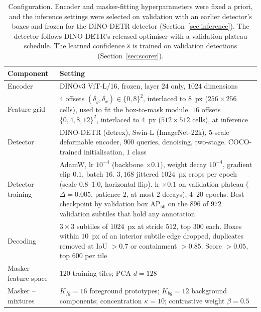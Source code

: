 \documentclass[remotesensing,article,submit,moreauthors]{Definitions/mdpi}
\begin{document}
\begin{table}[H]
\footnotesize
\renewcommand{\arraystretch}{1.0}
\setlength{\aboverulesep}{0.2ex}\setlength{\belowrulesep}{0.25ex}
\caption{Configuration. Encoder and masker-fitting hyperparameters were fixed a priori, and the inference settings were selected on validation with an earlier detector's boxes and frozen for the DINO-DETR detector (Section~\ref{sec:inference}). The detector follows DINO-DETR's released optimiser with a validation-plateau schedule. The learned confidence $\hat s$ is trained on validation detections (Section~\ref{sec:scorer}).\label{tab:config}}  
\begin{tabularx}{\textwidth}{KV}
\toprule
\textbf{Component} & \textbf{Setting} \\
\midrule
Encoder & DINOv3 ViT-L/16, frozen, layer $24$ only, $1024$ dimensions \\
Feature grid & $4$ offsets $(\delta_y,\delta_x) \in \{0,8\}^2$, interlaced to $8$~px ($256\times256$ cells), used to fit the box-to-mask module. $16$ offsets $\{0,4,8,12\}^2$, interlaced to $4$~px ($512\times512$ cells), at inference \\
Detector & DINO-DETR (detrex), Swin-L (ImageNet-22k), $5$-scale deformable encoder, $900$ queries, denoising, two-stage. COCO-trained initialisation, $1$ class \\
Detector training & AdamW, lr $10^{-4}$ (backbone $\times0.1$), weight decay $10^{-4}$, gradient clip $0.1$, batch $16$. $3{,}168$ jittered $1024$~px crops per epoch (scale $0.8$--$1.0$, horizontal flip). lr $\times0.1$ on validation plateau ($\Delta = 0.005$, patience $2$, at most $2$ decays), $4$--$20$ epochs. Best checkpoint by validation box AP$_{50}$ on the $896$ of $972$ validation subtiles that hold any annotation \\
Decoding & $3\times3$ subtiles of $1024$~px at stride $512$, top $300$ each. Boxes within $10$~px of an interior subtile edge dropped, duplicates removed at IoU $>0.7$ or containment $>0.85$. Score $>0.05$, top $600$ per tile \\
\midrule
Masker -- feature space & $120$ training tiles; PCA $d = 128$ \\
Masker -- mixtures & $K_{fg} = 16$ foreground prototypes; $K_{bg} = 12$ background components; concentration $\kappa = 10$; contrastive weight $\beta = 0.5$ \\

\end{tabularx}
\end{table}
\end{document}
